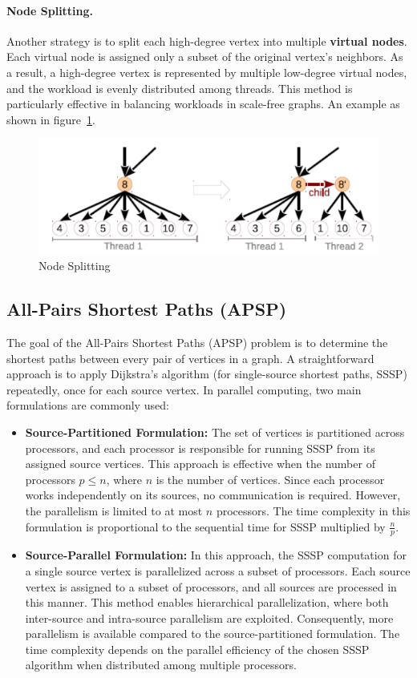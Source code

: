 \documentclass[12pt]{book}
\begin{document}
\paragraph{Node Splitting.}  
Another strategy is to split each high-degree vertex into multiple \textbf{virtual nodes}. Each virtual node is assigned only a subset of the original vertex’s neighbors. As a result, a high-degree vertex is represented by multiple low-degree virtual nodes, and the workload is evenly distributed among threads. This method is particularly effective in balancing workloads in scale-free graphs. An example as shown in figure~\ref{fig:nodesplit}.
\begin{figure}[ht]
    \centering
    \includegraphics[width=0.65\linewidth]{images/nodesplit.png}
    \caption{Node Splitting}
    \label{fig:nodesplit}
\end{figure}

\subsection{All-Pairs Shortest Paths (APSP)}
The goal of the All-Pairs Shortest Paths (APSP) problem is to determine the shortest paths between every pair of vertices in a graph. A straightforward approach is to apply Dijkstra's algorithm (for single-source shortest paths, SSSP) repeatedly, once for each source vertex. In parallel computing, two main formulations are commonly used:

\begin{itemize}
    \item \textbf{Source-Partitioned Formulation:}  
    The set of vertices is partitioned across processors, and each processor is responsible for running SSSP from its assigned source vertices. This approach is effective when the number of processors $p \leq n$, where $n$ is the number of vertices. Since each processor works independently on its sources, no communication is required. However, the parallelism is limited to at most $n$ processors. The time complexity in this formulation is proportional to the sequential time for SSSP multiplied by $\frac{n}{p}$.
    
    \item \textbf{Source-Parallel Formulation:}  
    In this approach, the SSSP computation for a single source vertex is parallelized across a subset of processors. Each source vertex is assigned to a subset of processors, and all sources are processed in this manner. This method enables hierarchical parallelization, where both inter-source and intra-source parallelism are exploited. Consequently, more parallelism is available compared to the source-partitioned formulation. The time complexity depends on the parallel efficiency of the chosen SSSP algorithm when distributed among multiple processors.
\end{itemize}
\end{document}
